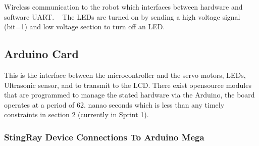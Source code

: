 Wireless communication to the robot which interfaces between hardware and software U\+A\+RT. ~\newline
 The L\+E\+Ds are turned on by sending a high voltage signal (bit=1) and low voltage section to turn off an L\+ED.\hypertarget{hardware_design_arduino}{}\subsection{Arduino Card}\label{hardware_design_arduino}
This is the interface between the microcontroller and the servo motors, L\+E\+Ds, Ultrasonic sensor, and to transmit to the L\+CD. There exist opensource modules that are programmed to manage the stated hardware via the Arduino, the board operates at a period of 62. nanao seconds which is less than any timely constraints in section 2 (currently in Sprint 1).\hypertarget{hardware_design_stingray_chart}{}\subsubsection{Sting\+Ray Device Connections To Arduino Mega}\label{hardware_design_stingray_chart}
\tabulinesep=1mm
